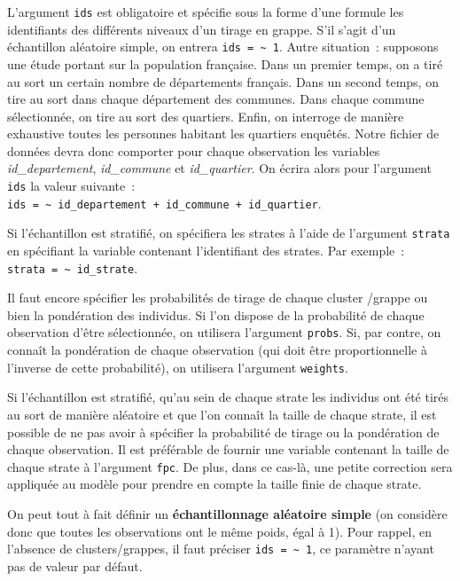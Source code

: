 \documentclass[
  letterpaper,
  DIV=11,
  numbers=noendperiod,
  oneside]{scrreprt}
\begin{document}
L'argument \texttt{ids} est obligatoire et spécifie sous la forme d'une
formule les identifiants des différents niveaux d'un tirage en grappe.
S'il s'agit d'un échantillon aléatoire simple, on entrera
\texttt{ids\ =\ \textasciitilde{}\ 1}. Autre situation~: supposons une
étude portant sur la population française. Dans un premier temps, on a
tiré au sort un certain nombre de départements français. Dans un second
temps, on tire au sort dans chaque département des communes. Dans chaque
commune sélectionnée, on tire au sort des quartiers. Enfin, on interroge
de manière exhaustive toutes les personnes habitant les quartiers
enquêtés. Notre fichier de données devra donc comporter pour chaque
observation les variables \emph{id\_departement}, \emph{id\_commune} et
\emph{id\_quartier}. On écrira alors pour l'argument \texttt{ids} la
valeur suivante~:\\
\texttt{ids\ =\ \textasciitilde{}\ id\_departement\ +\ id\_commune\ +\ id\_quartier}.

Si l'échantillon est stratifié, on spécifiera les strates à l'aide de
l'argument \texttt{strata} en spécifiant la variable contenant
l'identifiant des strates. Par exemple~:
\texttt{strata\ =\ \textasciitilde{}\ id\_strate}.

Il faut encore spécifier les probabilités de tirage de chaque cluster
/grappe ou bien la pondération des individus. Si l'on dispose de la
probabilité de chaque observation d'être sélectionnée, on utilisera
l'argument \texttt{probs}. Si, par contre, on connaît la pondération de
chaque observation (qui doit être proportionnelle à l'inverse de cette
probabilité), on utilisera l'argument \texttt{weights}.

Si l'échantillon est stratifié, qu'au sein de chaque strate les
individus ont été tirés au sort de manière aléatoire et que l'on connaît
la taille de chaque strate, il est possible de ne pas avoir à spécifier
la probabilité de tirage ou la pondération de chaque observation. Il est
préférable de fournir une variable contenant la taille de chaque strate
à l'argument \texttt{fpc}. De plus, dans ce cas-là, une petite
correction sera appliquée au modèle pour prendre en compte la taille
finie de chaque strate.

On peut tout à fait définir un \textbf{échantillonnage aléatoire simple}
(on considère donc que toutes les observations ont le même poids, égal à
1). Pour rappel, en l'absence de clusters/grappes, il faut préciser
\texttt{ids\ =\ \textasciitilde{}\ 1}, ce paramètre n'ayant pas de
valeur par défaut.
\end{document}
